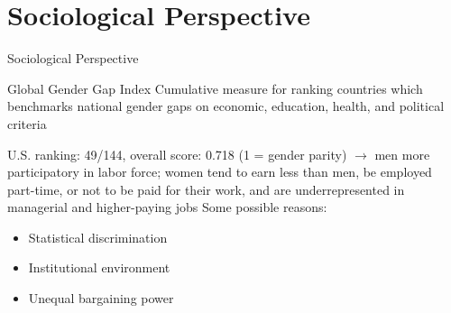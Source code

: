 \documentclass[usenames,dvipsnames]{beamer}
\begin{document}
    
    \section[]{Sociological Perspective}
    \begin{frame}{Sociological Perspective}
        \begin{block}{Global Gender Gap Index \emph{\parencite{schwab2017global}}}
            Cumulative measure for ranking countries which benchmarks national gender gaps on economic, education, health, and political criteria
        \end{block}
        U.S. ranking: 49/144, overall score: 0.718 (1 = gender parity)\newline
        $\rightarrow$ men more participatory in labor force; women tend to earn less than men, be employed part-time, or not to be paid for their work, and are underrepresented in managerial and higher-paying jobs\newline\newline
        Some possible reasons:
        \begin{itemize}
            \item Statistical discrimination \emph{\parencite{tilcsik2021statistical}}
            \item Institutional environment \emph{\parencite{beggs1995institutional}}
            \item Unequal bargaining power \emph{\parencite{folbre2021gender}}
        \end{itemize}
    \end{frame}
    
\end{document}

